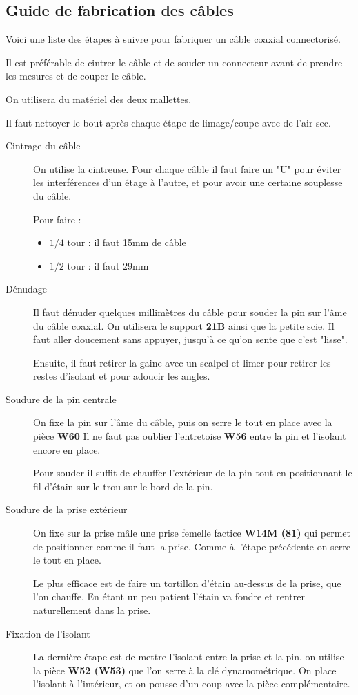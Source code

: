 \subsection{Guide de fabrication des câbles}
Voici une liste des étapes à suivre pour fabriquer un câble coaxial connectorisé.

Il est préférable de cintrer le câble et de souder un connecteur avant de prendre les mesures et de couper le câble.

On utilisera du matériel des deux mallettes.

Il faut nettoyer le bout après chaque étape de limage/coupe avec de l'air sec.

\begin{description}
    \item[Cintrage du câble] On utilise la cintreuse. Pour chaque câble il faut faire un "U" pour éviter les interférences d'un étage à l'autre, et pour avoir une certaine souplesse du câble.
    
    Pour faire : 
    \begin{itemize}
        \item $1/4$ tour : il faut 15mm de câble
        \item $1/2$ tour : il faut 29mm
    \end{itemize}
     \item[Dénudage] Il faut dénuder quelques millimètres du câble pour souder la pin sur l'âme du câble coaxial.
     On utilisera le support \textbf{21B} ainsi que la petite scie. Il faut aller doucement sans appuyer, jusqu'à ce qu'on sente que c'est "lisse".
     
     Ensuite, il faut retirer la gaine avec un scalpel et limer pour retirer les restes d'isolant et pour adoucir les angles.
     \item[Soudure de la pin centrale] On fixe la pin sur l'âme du câble, puis on serre le tout en place avec la pièce \textbf{W60} Il ne faut pas oublier l'entretoise \textbf{W56} entre la pin et l'isolant encore en place.
     
     Pour souder il suffit de chauffer l'extérieur de la pin tout en positionnant le fil d'étain sur le trou sur le bord de la pin.
     \item[Soudure de la prise extérieur] On fixe sur la prise mâle une prise femelle factice \textbf{W14M (81)} qui permet de positionner comme il faut la prise. Comme à l'étape précédente on serre le tout en place.
     
     Le plus efficace est de faire un tortillon d'étain au-dessus de la prise, que l'on chauffe. En étant un peu patient l'étain va fondre et rentrer naturellement dans la prise.
     \item[Fixation de l'isolant] La dernière étape est de mettre l'isolant entre la prise et la pin. on utilise la pièce \textbf{W52 (W53)}
     que l'on serre à la clé dynamométrique. On place l'isolant à l'intérieur, et on pousse d'un coup avec la pièce complémentaire.
     

\end{description}
